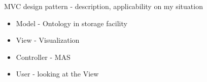 MVC design pattern - description, applicability on my situation
\begin{itemize}
\item Model - Ontology in storage facility
\item View - Visualization
\item Controller - MAS
\item User - looking at the View
\end{itemize}

    
    
    
